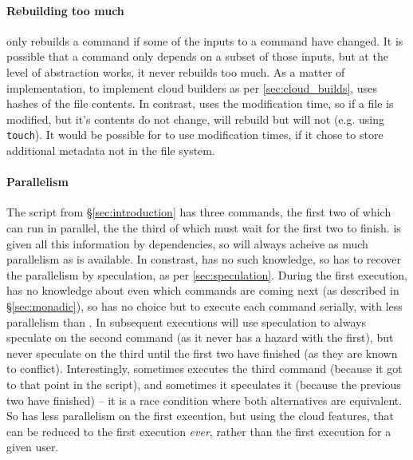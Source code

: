 \paragraph{Rebuilding too much} \Rattle only rebuilds a command if some of the inputs to a command have changed. It is possible that a command only depends on a subset of those inputs, but at the level of abstraction \Rattle works, it never rebuilds too much. As a matter of implementation, to implement cloud builders as per \ref{sec:cloud_builds}, \Rattle uses hashes of the file contents. In contrast, \Make uses the modification time, so if a file is modified, but it's contents do not change, \Make will rebuild but \Rattle will not (e.g. using \texttt{touch}). It would be possible for \Make to use modification times, if it chose to store additional metadata not in the file system.

\paragraph{Parallelism} The script from \S\ref{sec:introduction} has three commands, the first two of which can run in parallel, the the third of which must wait for the first two to finish. \Make is given all this information by dependencies, so will always acheive as much parallelism as is available. In constrast, \Rattle has no such knowledge, so has to recover the parallelism by speculation, as per \ref{sec:speculation}. During the first execution, \Rattle has no knowledge about even which commands are coming next (as described in \S\ref{sec:monadic}), so has no choice but to execute each command serially, with less parallelism than \Make. In subsequent executions \Rattle will use speculation to always speculate on the second command (as it never has a hazard with the first), but never speculate on the third until the first two have finished (as they are known to conflict). Interestingly, sometimes \Rattle executes the third command (because it got to that point in the script), and sometimes it speculates it (because the previous two have finished) -- it is a race condition where both alternatives are equivalent. So \Rattle has less parallelism on the first execution, but using the cloud features, that can be reduced to the first execution \emph{ever}, rather than the first execution for a given user.

